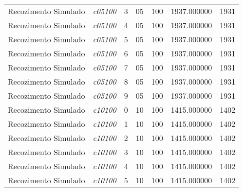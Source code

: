 {\begin{longtable}{cc|c|cc|cc}
			Recozimento Simulado & \textit{c05100}    & 3                               & 05               & 100              & 1937.000000                          & 1931 \\ 
			Recozimento Simulado & \textit{c05100}    & 4                               & 05               & 100              & 1937.000000                          & 1931 \\ 
			Recozimento Simulado & \textit{c05100}    & 5                               & 05               & 100              & 1937.000000                          & 1931 \\ 
			Recozimento Simulado & \textit{c05100}    & 6                               & 05               & 100              & 1937.000000                          & 1931 \\ 
			Recozimento Simulado & \textit{c05100}    & 7                               & 05               & 100              & 1937.000000                          & 1931 \\ 
			Recozimento Simulado & \textit{c05100}    & 8                               & 05               & 100              & 1937.000000                          & 1931 \\ 
			Recozimento Simulado & \textit{c05100}    & 9                               & 05               & 100              & 1937.000000                          & 1931 \\ \hline
			Recozimento Simulado & \textit{c10100}    & 0                               & 10               & 100              & 1415.000000                          & 1402 \\ 
			Recozimento Simulado & \textit{c10100}    & 1                               & 10               & 100              & 1415.000000                          & 1402 \\ 
			Recozimento Simulado & \textit{c10100}    & 2                               & 10               & 100              & 1415.000000                          & 1402 \\ 
			Recozimento Simulado & \textit{c10100}    & 3                               & 10               & 100              & 1415.000000                          & 1402 \\ 
			Recozimento Simulado & \textit{c10100}    & 4                               & 10               & 100              & 1415.000000                          & 1402 \\ 
			Recozimento Simulado & \textit{c10100}    & 5                               & 10               & 100              & 1415.000000                          & 1402 \\ 

\end{longtable}}
